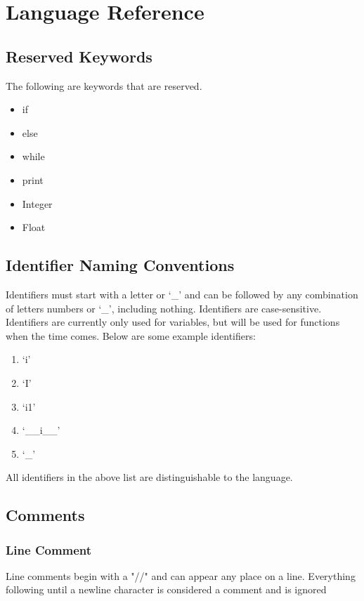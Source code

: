 \documentclass{standalone}
\begin{document}
\setlength{\grammarparsep}{20pt plus 1pt minus 1pt} %
\setlength{\grammarindent}{12em} %

\chapter{Language Reference}

	\section{Reserved Keywords}
		The following are keywords that are reserved.
		\begin{itemize}
			\item if
			\item else
			\item while
			\item print
			\item Integer
			\item Float
		\end{itemize}

	\section{Identifier Naming Conventions}
		Identifiers must start with a letter or `_' and can be followed by any combination of letters numbers or `_', including nothing. Identifiers are case-sensitive. Identifiers are currently only used for variables, but will be used for functions when the time comes. Below are some example identifiers:
		\begin{enumerate}
			\item `i'
			\item `I'
			\item `i1'
			\item `__i__'
			\item `_'
		\end{enumerate}
		All identifiers in the above list are distinguishable to the language.

	\section{Comments}
		\subsection{Line Comment}
			Line comments begin with a "//" and can appear any place on a line. Everything following  until a newline character is considered a comment and is ignored
\end{document}
